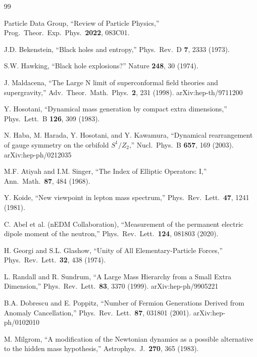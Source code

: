 \documentclass[11pt,a4paper]{article}
\theoremstyle{plain}
\theoremstyle{definition}
\theoremstyle{remark}
\begin{document}
\begin{thebibliography}{99}

 Particle Data Group, ``Review of Particle Physics,'' Prog.\ Theor.\ Exp.\ Phys.\ \textbf{2022}, 083C01.

 J.D. Bekenstein, ``Black holes and entropy,'' Phys.\ Rev.\ D \textbf{7}, 2333 (1973).

 S.W. Hawking, ``Black hole explosions?'' Nature \textbf{248}, 30 (1974).

 J. Maldacena, ``The Large N limit of superconformal field theories and supergravity,'' Adv.\ Theor.\ Math.\ Phys.\ \textbf{2}, 231 (1998). arXiv:hep-th/9711200

 Y. Hosotani, ``Dynamical mass generation by compact extra dimensions,'' Phys.\ Lett.\ B \textbf{126}, 309 (1983).

 N. Haba, M. Harada, Y. Hosotani, and Y. Kawamura, ``Dynamical rearrangement of gauge symmetry on the orbifold $S^1/Z_2$,'' Nucl.\ Phys.\ B \textbf{657}, 169 (2003). arXiv:hep-ph/0212035

 M.F. Atiyah and I.M. Singer, ``The Index of Elliptic Operators: I,'' Ann.\ Math.\ \textbf{87}, 484 (1968).

 Y. Koide, ``New viewpoint in lepton mass spectrum,'' Phys.\ Rev.\ Lett.\ \textbf{47}, 1241 (1981).

 C. Abel et al. (nEDM Collaboration), ``Measurement of the permanent electric dipole moment of the neutron,'' Phys.\ Rev.\ Lett.\ \textbf{124}, 081803 (2020).

 H. Georgi and S.L. Glashow, ``Unity of All Elementary-Particle Forces,'' Phys.\ Rev.\ Lett.\ \textbf{32}, 438 (1974).

 L. Randall and R. Sundrum, ``A Large Mass Hierarchy from a Small Extra Dimension,'' Phys.\ Rev.\ Lett.\ \textbf{83}, 3370 (1999). arXiv:hep-ph/9905221

 B.A. Dobrescu and E. Poppitz, ``Number of Fermion Generations Derived from Anomaly Cancellation,'' Phys.\ Rev.\ Lett.\ \textbf{87}, 031801 (2001). arXiv:hep-ph/0102010

 M. Milgrom, ``A modification of the Newtonian dynamics as a possible alternative to the hidden mass hypothesis,'' Astrophys.\ J.\ \textbf{270}, 365 (1983).


\end{thebibliography}
\end{document}
